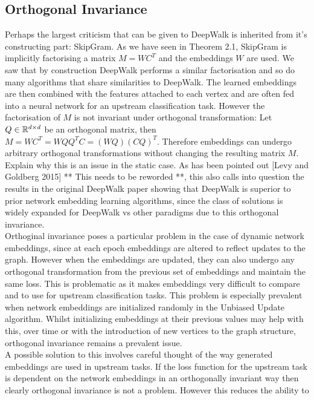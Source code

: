 \documentclass[a4paper]{article}
\begin{document}
\subsection{Orthogonal Invariance}
Perhaps the largest criticism that can be given to DeepWalk is inherited from it's constructing part: SkipGram. As we have
seen in Theorem 2.1, SkipGram is implicitly factorising a matrix $M = WC^T$ and the embeddings $W$ are used. We saw that
by construction DeepWalk performs a similar factorisation and so do many algorithms that share similarities to DeepWalk. The
learned embeddings are then combined with the features attached to each vertex and are often fed into a neural network for an
upstream classification task. However the factorisation of $M$ is not invariant under orthogonal transformation: Let $Q \in \R^{d \times d}$
be an orthogonal matrix, then $M = WC^T = WQQ^TC = (WQ)(CQ)^T$. Therefore embeddings can undergo arbitrary orthogonal transformations
without changing the resulting matrix $M$.\\
Explain why this is an issue in the static case. As has been pointed out [Levy and Goldberg 2015] ** This needs to be reworded **, this also calls into question the results in the original DeepWalk paper showing that DeepWalk is superior to prior network embedding learning algorithms, since the class of solutions is widely expanded for DeepWalk vs other paradigms due
to this orthogonal invariance.\\
Orthoginal invariance poses a particular problem in the case of dynamic network embeddings, since at each epoch embeddings are altered to reflect
updates to the graph. However when the embeddings are updated, they can also undergo any orthogonal transformation from the previous set of embeddings
and maintain the same loss. This is problematic as it makes embeddings very difficult to compare and to use for upstream classification tasks. This problem is especially
prevalent when network embeddings are initialized randomly in the Unbiased Update algorithm. Whilst initializing embeddings at their previous values may help with this,
over time or with the introduction of new vertices to the graph structure, orthogonal invariance remains a prevalent issue.\\
A possible solution to this involves careful thought of the way generated embeddings are used in upstream tasks. If the loss function for the upstream task
is dependent on the network embeddings in an orthogonally invariant way then clearly orthogonal invariance is not a problem. However this reduces the ability to
\end{document}
